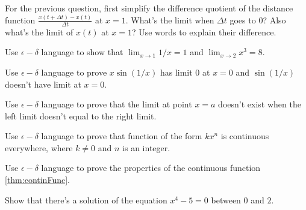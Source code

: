 \documentclass[Calculus 1 Recitation.tex]{subfiles}
\begin{document}
\begin{myleftlinebox}
	For the previous question, first simplify the difference quotient of the distance function $\frac{x(t+\Delta t)-x(t)}{\Delta t}$ at $x=1$. What's the limit when $\Delta t$ goes to $0$? Also what's the limit of $x(t)$ at $x=1$? Use words to explain their difference.
	\tcblower
	\vspace{2em}
\end{myleftlinebox}


\begin{myleftlinebox}
	Use $\epsilon-\delta$ language to show that $\lim_{x\to 1} 1/x = 1$ and $\lim_{x\to 2} x^3 = 8$.
	\tcblower
	\vspace{2em}
\end{myleftlinebox}

\begin{myleftlinebox}
	Use $\epsilon-\delta$ language to prove $x\sin(1/x)$ has limit $0$ at $x=0$ and $\sin(1/x)$ doesn't have limit at $x=0$.
	\tcblower
	\vspace{2em}
\end{myleftlinebox}

\begin{myleftlinebox}
	Use $\epsilon-\delta$ language to prove that the limit at point $x=a$ doesn't exist when the left limit doesn't equal to the right limit.
	\tcblower
	\vspace{2em}
\end{myleftlinebox}

\begin{myleftlinebox}
	Use $\epsilon-\delta$ language to prove that function of the form $k x^n$ is continuous everywhere, where $k\neq 0$ and $n$ is an integer.
	\tcblower
	\vspace{2em}
\end{myleftlinebox}

\begin{myleftlinebox}
	Use $\epsilon-\delta$ language to prove the properties of the continuous function \autoref {thm:continFunc}.
	\tcblower
	\vspace{2em}
\end{myleftlinebox}

\begin{myleftlinebox}
	Show that there's a solution of the equation $x^4-5=0$ between $0$ and $2$.
	\tcblower
	\vspace{2em}
\end{myleftlinebox}
\end{document}
